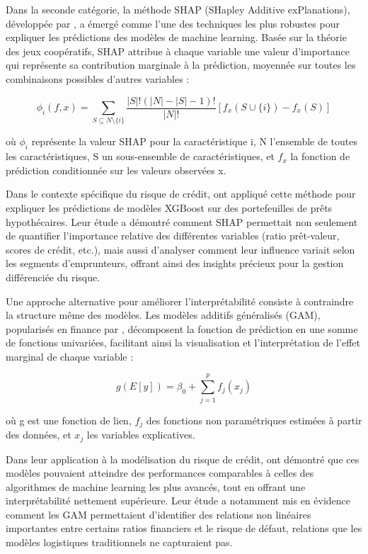 Dans la seconde catégorie, la méthode SHAP (SHapley Additive exPlanations), développée par \citet{lundberg2017}, a émergé comme l'une des techniques les plus robustes pour expliquer les prédictions des modèles de machine learning. Basée sur la théorie des jeux coopératifs, SHAP attribue à chaque variable une valeur d'importance qui représente sa contribution marginale à la prédiction, moyennée sur toutes les combinaisons possibles d'autres variables :

\begin{equation}
\phi_i(f, x) = \sum_{S \subseteq N \setminus \{i\}} \frac{|S|!(|N|-|S|-1)!}{|N|!} [f_x(S \cup \{i\}) - f_x(S)]
\end{equation}

où $\phi_i$ représente la valeur SHAP pour la caractéristique i, N l'ensemble de toutes les caractéristiques, S un sous-ensemble de caractéristiques, et $f_x$ la fonction de prédiction conditionnée sur les valeurs observées x.

Dans le contexte spécifique du risque de crédit, \citet{bracke2019} ont appliqué cette méthode pour expliquer les prédictions de modèles XGBoost sur des portefeuilles de prêts hypothécaires. Leur étude a démontré comment SHAP permettait non seulement de quantifier l'importance relative des différentes variables (ratio prêt-valeur, scores de crédit, etc.), mais aussi d'analyser comment leur influence variait selon les segments d'emprunteurs, offrant ainsi des insights précieux pour la gestion différenciée du risque.

Une approche alternative pour améliorer l'interprétabilité consiste à contraindre la structure même des modèles. Les modèles additifs généralisés (GAM), popularisés en finance par \citet{caruana2015}, décomposent la fonction de prédiction en une somme de fonctions univariées, facilitant ainsi la visualisation et l'interprétation de l'effet marginal de chaque variable :

\begin{equation}
g(E[y]) = \beta_0 + \sum_{j=1}^p f_j(x_j)
\end{equation}

où g est une fonction de lien, $f_j$ des fonctions non paramétriques estimées à partir des données, et $x_j$ les variables explicatives.

Dans leur application à la modélisation du risque de crédit, \citet{dumitrescu2022} ont démontré que ces modèles pouvaient atteindre des performances comparables à celles des algorithmes de machine learning les plus avancés, tout en offrant une interprétabilité nettement supérieure. Leur étude a notamment mis en évidence comment les GAM permettaient d'identifier des relations non linéaires importantes entre certains ratios financiers et le risque de défaut, relations que les modèles logistiques traditionnels ne capturaient pas.

